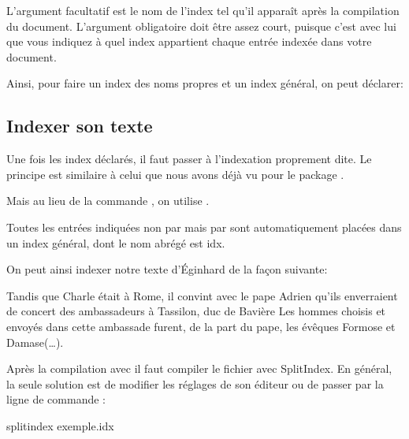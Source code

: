 L'argument facultatif est le nom de l'index tel qu'il apparaît après la compilation du document. L'argument obligatoire doit être assez court, puisque c'est avec lui que vous indiquez à quel index appartient chaque entrée indexée dans votre document.


Ainsi, pour faire un index des noms propres et un index général, on peut déclarer:

\begin{latexcode}
\end{latexcode}

\subsection{Indexer son texte}
Une fois  les index déclarés, il faut passer à l'indexation proprement dite. Le principe est similaire à celui que nous avons déjà vu pour le package .

Mais au lieu de la commande , on utilise . 

\begin{plusloins}

Toutes les entrées indiquées non par  mais par  sont automatiquement placées dans un index général, dont le nom abrégé est idx.

\end{plusloins}
On peut ainsi indexer notre texte d'Éginhard de la façon suivante:

\begin{latexcode}
Tandis que Charle était à Rome, il convint
avec le pape Adrien qu’ils enverraient de concert
des ambassadeurs à Tassilon, duc de Bavière
\textelp{}
Les hommes choisis et envoyés dans cette ambassade furent, de 
la part du pape, les évêques Formose et 
Damase(…).
\end{latexcode}

Après la compilation avec \XeLaTeX il faut compiler le fichier  avec SplitIndex. En général, la seule solution est de modifier les réglages de son éditeur ou de  passer par la ligne de commande  :

\begin{bashcode}
splitindex exemple.idx
\end{bashcode}

